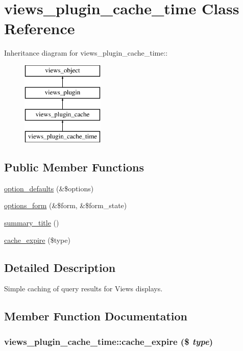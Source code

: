 \hypertarget{classviews__plugin__cache__time}{
\section{views\_\-plugin\_\-cache\_\-time Class Reference}
\label{classviews__plugin__cache__time}
}
Inheritance diagram for views\_\-plugin\_\-cache\_\-time::\begin{figure}[H]
\begin{center}
\leavevmode
\includegraphics[height=4cm]{classviews__plugin__cache__time}
\end{center}
\end{figure}
\subsection*{Public Member Functions}
\begin{CompactItemize}
\item 
\hyperlink{classviews__plugin__cache__time_c89ed6d01b1bd3b9853166b2048ece8e}{option\_\-defaults} (\&\$options)
\item 
\hyperlink{classviews__plugin__cache__time_c12d2ba054e232ae1d425d189a2d78d9}{options\_\-form} (\&\$form, \&\$form\_\-state)
\item 
\hyperlink{classviews__plugin__cache__time_c8eaac0cd0c620c7583dbbe0481ca62c}{summary\_\-title} ()
\item 
\hyperlink{classviews__plugin__cache__time_6e04720a6807812cfb5840ea7b49baaa}{cache\_\-expire} (\$type)
\end{CompactItemize}


\subsection{Detailed Description}
Simple caching of query results for Views displays. 

\subsection{Member Function Documentation}
\hypertarget{classviews__plugin__cache__time_6e04720a6807812cfb5840ea7b49baaa}{
\subsubsection[{cache\_\-expire}]{\setlength{\rightskip}{0pt plus 5cm}views\_\-plugin\_\-cache\_\-time::cache\_\-expire (\$ {\em type})}}
\label{classviews__plugin__cache__time_6e04720a6807812cfb5840ea7b49baaa}


